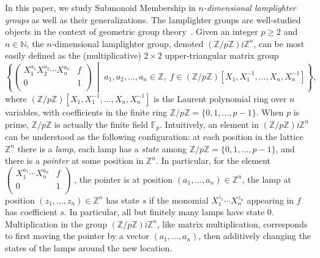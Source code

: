 \documentclass[a4paper,UKenglish,cleveref, autoref, thm-restate]{lipics-v2021}
\newcommand{\Z}{\mathbb{Z}}
\newcommand{\N}{\mathbb{N}}
\newcommand{\F}{\mathbb{F}}
\theoremstyle{definition}
\theoremstyle{definition}
\theoremstyle{definition}
\begin{document}
In this paper, we study Submonoid Membership in \emph{$n$-dimensional lamplighter groups} as well as their generalizations.
The lamplighter groups are well-studied objects in the context of geometric group theory~\cite{grigorchuk2001lamplighter, silva2005class}.
Given an integer $p \geq 2$ and $n \in \N$, the $n$-dimensional lamplighter group, denoted $(\Z/p\Z) \wr \Z^n$, can be most easily defined as the (multiplicative) $2 \times 2$ upper-triangular matrix group
\begin{equation}\label{eq:deflamp}
\left\{
\begin{pmatrix}
    X_1^{a_1} X_2^{a_2} \cdots X_n^{a_n} & f \\
    0 & 1\\
\end{pmatrix}
\;\middle|\;
a_1, a_2, \ldots, a_n \in \Z, \; f \in (\Z/p\Z)[X_1, X_1^{-1}, \ldots, X_n, X_n^{-1}]
\right\},
\end{equation}
where $(\Z/p\Z)[X_1, X_1^{-1}, \ldots, X_n, X_n^{-1}]$ is the Laurent polynomial ring over $n$ variables, with coefficients in the finite ring $\Z/p\Z = \{0, 1, \ldots, p-1\}$.
When $p$ is prime, $\Z/p\Z$ is actually the finite field $\F_p$.
Intuitively, an element in $(\Z/p\Z) \wr \Z^n$ can be understood as the following configuration: at each position in the lattice $\Z^n$ there is a \emph{lamp}, each lamp has a \emph{state} among $\Z/p\Z = \{0, 1, \ldots, p-1\}$, and there is a \emph{pointer} at some position in $\Z^n$.
In particular, for the element 
$
\begin{pmatrix}
    X_1^{a_1} \cdots X_n^{a_n} & f \\
    0 & 1\\
\end{pmatrix}
$
, the pointer is at position $(a_1, \ldots, a_n) \in \Z^n$, the lamp at position $(z_1, \ldots, z_n) \in \Z^n$ has state $s$ if the monomial $X_1^{z_1} \cdots X_n^{z_n}$ appearing in $f$ has coefficient $s$. In particular, all but finitely many lamps have state 0.
Multiplication in the group $(\Z/p\Z) \wr \Z^n$, like matrix multiplication, corresponds to first moving the pointer by a vector $(a_1, \ldots, a_n)$, then additively changing the states of the lamps around the new location.
\end{document}
